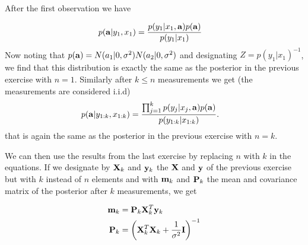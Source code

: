 \documentclass[a4paper,oneside,article]{memoir}
\begin{document}

\subsubsection{}

After the first observation we have

\begin{align}
	p(\mathbf{a}|y_1,x_1)&=\frac{p(y_1|x_1,\mathbf{a})p(\mathbf{a})}{p(y_1|x_1)}
\end{align}
Now noting that $p(\mathbf{a})=N(a_1|0,\sigma^2)N(a_2|0,\sigma^2)$ and designating $Z=p(y_1|x_1)^{-1}$, 
we find that this distribution is exactly the same as the posterior in the previous exercise with $n=1$.
Similarly after $k\leq n$ measurements we get (the measurements are considered i.i.d)
\begin{align}
	p(\mathbf{a}|y_{1:k},x_{1:k})&=\frac{\prod_{j=1}^k p(y_j|x_j,\mathbf{a})p(\mathbf{a})}{p(y_{1:k}|x_{1:k})}.
\end{align}
that is again the same as the posterior in the previous exercise with $n=k$.

We can then use the results from the last exercise by replacing $n$ with $k$ in the equations. If we designate by 
$\mathbf{X}_k$ and $\mathbf{y}_k$ the $\mathbf{X}$ and $\mathbf{y}$ of the previous exercise but with $k$ instead of $n$ elements and with $\mathbf{m}_k$ and 
$\mathbf{P}_k$ the mean and covariance matrix of the posterior after $k$ measurements,
we get

\begin{align}
	\mathbf{m}_k &= \mathbf{P}_k\mathbf{X}^T_k\mathbf{y}_k \label{eq:regression_batch_mean}\\
	\mathbf{P}_k&= \left(\mathbf{X}_k^T\mathbf{X}_k+\frac{1}{\sigma^2}\mathbf{I}\right)^{-1}\\
\end{align} 

\subsubsection{}
\end{document}
